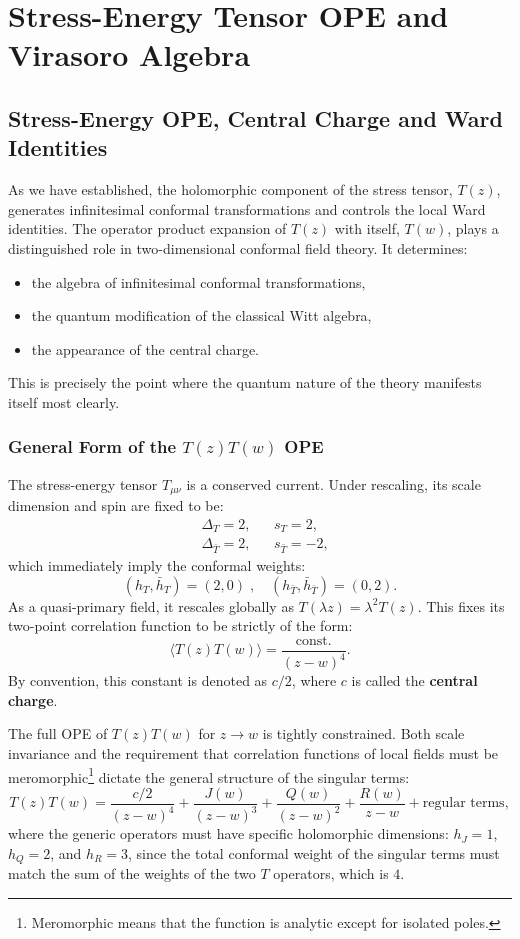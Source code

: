 \chapter{Stress-Energy Tensor OPE and Virasoro Algebra}

\section{Stress-Energy OPE, Central Charge and Ward Identities}

As we have established, the holomorphic component of the stress tensor, \(T(z)\), generates infinitesimal conformal transformations and controls the local Ward identities. The operator product expansion of \(T(z)\) with itself, \(T(w)\), plays a distinguished role in two-dimensional conformal field theory. It determines:
\begin{itemize}
    \item the algebra of infinitesimal conformal transformations,
    \item the quantum modification of the classical Witt algebra,
    \item the appearance of the central charge.
\end{itemize}
This is precisely the point where the quantum nature of the theory manifests itself most clearly.

\subsection{General Form of the \(T(z)T(w)\) OPE}

The stress-energy tensor \(T_{\mu\nu}\) is a conserved current. Under rescaling, its scale dimension and spin are fixed to be:
\[
    \begin{aligned}
         & \Delta_T = 2,         &  & s_T = 2,          \\
         & \Delta_{\bar{T}} = 2, &  & s_{\bar{T}} = -2,
    \end{aligned}
\]
which immediately imply the conformal weights:
\[
    (h_T, \bar{h}_T) = (2,0) \;, \quad (h_{\bar{T}}, \bar{h}_{\bar{T}}) = (0,2).
\]
As a quasi-primary field, it rescales globally as \(T(\lambda z) = \lambda^2 T(z)\). This fixes its two-point correlation function to be strictly of the form:
\[
    \langle T(z)T(w) \rangle = \frac{\text{const.}}{(z-w)^4}.
\]
By convention, this constant is denoted as \(c/2\), where \(c\) is called the \textbf{central charge}.

The full OPE of \(T(z)T(w)\) for \(z \to w\) is tightly constrained. Both scale invariance and the requirement that correlation functions of local fields must be meromorphic\footnote{Meromorphic means that the function is analytic except for isolated poles.} dictate the general structure of the singular terms:
\[
    T(z)T(w) = \frac{c/2}{(z-w)^4} + \frac{J(w)}{(z-w)^3} + \frac{Q(w)}{(z-w)^2} + \frac{R(w)}{z-w} + \text{regular terms},
\]
where the generic operators must have specific holomorphic dimensions: \(h_J = 1\), \(h_Q = 2\), and \(h_R = 3\), since the total conformal weight of the singular terms must match the sum of the weights of the two \(T\) operators, which is \(4\).

